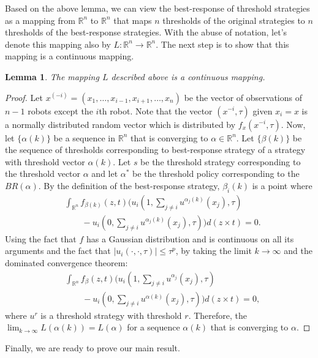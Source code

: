 \documentclass[conference]{ieeeconf}
\newtheorem{lemma}{Lemma}
\def\R{\mathbb{R}}
\begin{document}
Based on the above lemma, we can view the best-response of threshold strategies as a mapping from $\R^n$ to $\R^n$ that maps $n$ thresholds of the original strategies to $n$ thresholds of the best-response strategies. With the abuse of notation, let's denote this mapping also by $L:\R^n\to\R^n$. The next step is to show that this mapping is a continuous mapping. 
\begin{lemma}\label{lemma:continuous}
The mapping $L$ described above is a continuous mapping. 
\end{lemma}
\begin{proof}
Let $x^{(-i)}=(x_1,\ldots,x_{i-1},x_{i+1},\ldots,x_n)$ be the vector of observations of $n-1$ robots except the $i$th robot. Note that the vector $(x^{-i},\tau)$ given $x_i=x$ is a normally distributed random vector which is distributed by $f_{x}(x^{-i},\tau)$. Now, let $\{\alpha(k)\}$ be a sequence in $\R^n$ that is converging to $\alpha\in\R^n$. Let $\{\beta(k)\}$ be the sequence of thresholds corresponding to best-response strategy of a strategy with threshold vector $\alpha(k)$. Let $s$ be the threshold strategy corresponding to the threshold vector $\alpha$ and let $\alpha^*$ be the threshold policy corresponding to the $BR(\alpha)$. By the definition of the best-response strategy, $\beta_i(k)$ is a point where 
\begin{align*}
&\int_{\R^{n}}f_{\beta(k)}(z,t)(u_i(1,\sum_{j\not=i}u^{\alpha_j(k)}(x_j),\tau)\\
&\qquad-u_i(0,\sum_{j\not=i}u^{\alpha_j(k)}(x_j),\tau))d(z\times t)=0.
\end{align*}
Using the fact that $f$ has a Gaussian distribution and is continuous on all its arguments and the fact that $|u_i(\cdot,\cdot,\tau)|\leq \tau^p$, by taking the limit $k\to\infty$ and the dominated convergence theorem:
\begin{align*}
&\int_{\R^{n}}f_{\beta}(z,t)(u_i(1,\sum_{j\not=i}u^{\alpha_j}(x_j),\tau)\\ 
&\qquad-u_i(0,\sum_{j\not=i}u^{\alpha(k)}(x_j),\tau))d(z\times t)=0,
\end{align*}
where $u^{r}$ is a threshold strategy with threshold $r$. Therefore, the $\lim_{k\to\infty}L(\alpha(k))=L(\alpha)$ for a sequence $\alpha(k)$ that is converging to $\alpha$.
\end{proof}
Finally, we are ready to prove our main result. 
\end{document}
